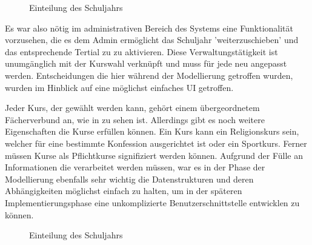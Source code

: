 \begin{figure}[h]
\begin{center}


\end{center}
\caption[\textbf{Einteilung des Schuljahrs}]{Einteilung des Schuljahrs}
\label{fig:Schuljahreinteilung}
\end{figure}

Es war also nötig im administrativen Bereich des Systems eine Funktionalität vorzusehen, die es dem Admin ermöglicht das Schuljahr 'weiterzuschieben' und das entsprechende Tertial zu zu aktivieren.
Diese Verwaltungstätigkeit ist unumgänglich mit der Kurswahl verknüpft und muss für jede neu angepasst werden. 
Entscheidungen die hier während der Modellierung getroffen wurden, wurden im Hinblick auf eine möglichst einfaches \ac{UI} getroffen.

Jeder Kurs, der gewählt werden kann, gehört einem übergeordnetem Fächerverbund an, wie in  zu sehen ist.
Allerdings gibt es noch weitere Eigenschaften die Kurse erfüllen können. Ein Kurs kann ein Religionskurs sein, welcher für eine bestimmte Konfession ausgerichtet ist oder ein Sportkurs.
Ferner müssen Kurse als Pflichtkurse signifiziert werden können.
Aufgrund der Fülle an Informationen die verarbeitet werden müssen, war es in der Phase der Modellierung ebenfalls sehr wichtig die Datenstrukturen und deren Abhängigkeiten möglichst einfach zu halten, um in der späteren Implementierungsphase eine unkomplizierte Benutzerschnittstelle entwicklen zu können. 

\begin{figure}[h]
\begin{center}


\end{center}
\caption[\textbf{Einteilung des Schuljahrs}]{Einteilung des Schuljahrs}
\label{fig:KursFaecherverbund}
\end{figure}

